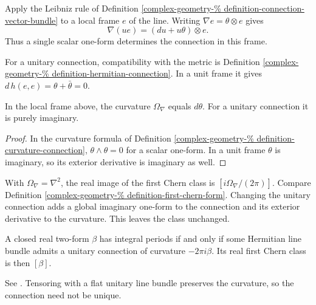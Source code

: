 \begin{remark}
\label{definition-connection-line-bundle}
Apply the Leibniz rule of Definition
\ref{complex-geometry-%
definition-connection-vector-bundle}
to a local frame $e$ of the line. Writing
$\nabla e=\theta\otimes e$ gives
$$
\nabla(ue)=(du+u\theta)\otimes e .
$$
Thus a single scalar one-form determines
the connection in this frame.
\end{remark}

\begin{remark}
\label{definition-unitary-connection}
For a unitary connection, compatibility
with the metric is Definition
\ref{complex-geometry-%
definition-hermitian-connection}.
In a unit frame it gives
$d\,h(e,e)=\theta+\bar\theta=0$.
\end{remark}

\begin{lemma}
\label{lemma-local-curvature-line-bundle}
In the local frame above, the curvature
$\Omega_\nabla$ equals $d\theta$. For a
unitary connection it is purely imaginary.
\end{lemma}

\begin{proof}
In the curvature formula of Definition
\ref{complex-geometry-%
definition-curvature-connection},
$\theta\wedge\theta=0$ for a scalar
one-form. In a unit frame $\theta$ is
imaginary, so its exterior derivative is
imaginary as well.
\end{proof}

\begin{remark}
\label{definition-first-chern-class}
With $\Omega_\nabla=\nabla^2$, the real
image of the first Chern class is
$[i\Omega_\nabla/(2\pi)]$. Compare
Definition \ref{complex-geometry-%
definition-first-chern-form}.
Changing the unitary connection adds a
global imaginary one-form to the connection
and its exterior derivative to the
curvature. This leaves the class unchanged.
\end{remark}

\begin{theorem}
\label{theorem-weil-integrality}
A closed real two-form $\beta$ has integral
periods if and only if some Hermitian line
bundle admits a unitary connection of
curvature $-2\pi i\beta$. Its real first
Chern class is then $[\beta]$.
\end{theorem}

See \cite[Theorem 23.9]{hallq}. Tensoring
with a flat unitary line bundle preserves
the curvature, so the connection need not
be unique.


